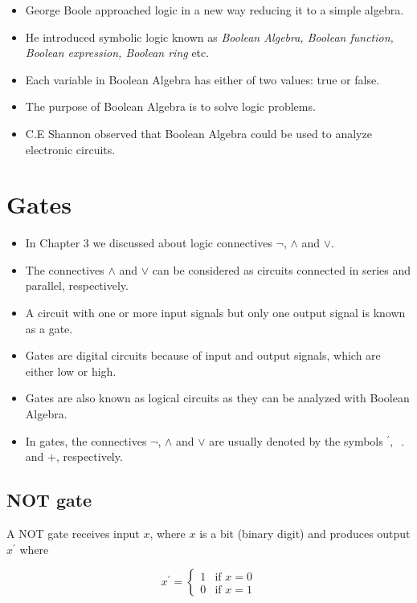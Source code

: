 \documentclass[]{book}
\providecommand{\tightlist}{%
  \setlength{\itemsep}{0pt}\setlength{\parskip}{0pt}}
\begin{document}
\begin{itemize}
\tightlist
\item
  George Boole approached logic in a new way reducing it to a simple algebra.
\item
  He introduced symbolic logic known as \emph{Boolean Algebra, Boolean function, Boolean expression, Boolean ring} etc.
\item
  Each variable in Boolean Algebra has either of two values: true or false.
\item
  The purpose of Boolean Algebra is to solve logic problems.
\item
  C.E Shannon observed that Boolean Algebra could be used to analyze electronic circuits.
\end{itemize}

\hypertarget{gates}{%
\section{Gates}\label{gates}}

\begin{itemize}
\tightlist
\item
  In Chapter 3 we discussed about logic connectives \(\lnot\), \(\land\) and \(\lor\).
\item
  The connectives \(\land\) and \(\lor\) can be considered as circuits connected in series and parallel, respectively.
\item
  A circuit with one or more input signals but only one output signal is known as a gate.
\item
  Gates are digital circuits because of input and output signals, which are either low or high.
\item
  Gates are also known as logical circuits as they can be analyzed with Boolean Algebra.
\item
  In gates, the connectives \(\lnot\), \(\land\) and \(\lor\) are usually denoted by the symbols \(^\prime, \;\;.\) and \(+\), respectively.
\end{itemize}

\hypertarget{not-gate}{%
\subsection{NOT gate}\label{not-gate}}

A NOT gate receives input \(x\), where \(x\) is a bit (binary digit) and produces output \(x^\prime\) where

\begin{equation}
x^\prime =
\begin{cases} 
1 & \text{if } x=0\\
0 & \text{if } x=1
\end{cases}
\end{equation}
\end{document}
